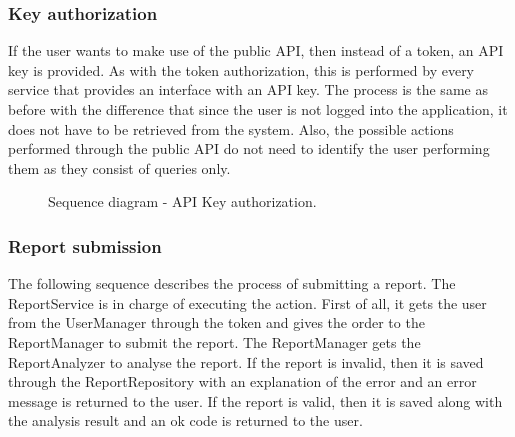 \subsubsection{Key authorization}
If the user wants to make use of the public API, then instead of a token, an API key is provided. As with the token authorization, this is performed by every service that provides an interface with an API key. The process is the same as before with the difference that since the user is not logged into the application, it does not have to be retrieved from the system. Also, the possible actions performed through the public API do not need to identify the user performing them as they consist of queries only.
\begin{figure}[H]
    \centering
    \caption{\label{fig:sequence-api-key-auth}Sequence diagram - API Key authorization.}
\end{figure}

\subsubsection{Report submission}
The following sequence describes the process of submitting a report.
The ReportService is in charge of executing the action. First of all, it gets the user from the UserManager through the token and gives the order to the ReportManager to submit the report. The ReportManager gets the ReportAnalyzer to analyse the report. If the report is invalid, then it is saved through the ReportRepository with an explanation of the error and an error message is returned to the user. If the report is valid, then it is saved along with the analysis result and an ok code is returned to the user.

